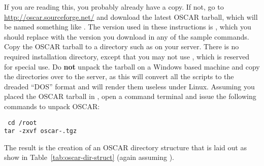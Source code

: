 If you are reading this, you probably already have a copy. If not, go
to \url{http://oscar.sourceforge.net/} and download the latest OSCAR
tarball, which will be named something like
.  The version used in these
instructions is \oscarversion, which you should replace with the
version you download in any of the sample \begchange commands. Copy
the OSCAR tarball to a directory such as  on \endchange
your server. There is no required installation directory, except that
you may not use , which is reserved for special
use. Do {\bf not} unpack the tarball on a Windows based machine and
copy the directories over to the server, as this will convert all the
scripts to the dreaded ``DOS'' format and will render them useless
under Linux.  Assuming you placed the OSCAR tarball in \begchange
{}, \endchange open a command terminal and issue the
following commands to unpack OSCAR:

\vspace{11pt}
\begchange
{\tt
  cd /root \\
\indent  tar -zxvf oscar-\oscarversion.tgz
}
\endchange
\vspace{11pt}
    
The result is the creation of an OSCAR directory structure that is
laid out as show in Table~\ref{tab:oscar-dir-struct} (again assuming
\begchange
{}).
\endchange

